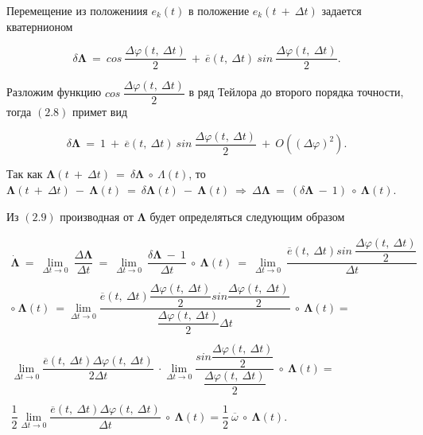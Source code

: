 \documentclass[14pt]{extreport}
\begin{document}
Перемещение из положениия $e_k(t)$ в положение $e_k(t\ +\ \Delta t)$ задается кватернионом

\begin{equation}
\delta\boldsymbol\Lambda\ =\ cos\ \dfrac{\Delta\varphi(t,\ \Delta t)}{2}\ +\ \overline{e}(t,\ \Delta t)\ sin\ \dfrac{\Delta\varphi(t,\ \Delta t)}{2}.
\end{equation}

Разложим функцию $cos\ \dfrac{\Delta\varphi(t,\ \Delta t)}{2}$ в ряд Тейлора до второго порядка точности, тогда $(2.8)$ примет вид

\begin{equation}
\delta\boldsymbol\Lambda\ =\ 1\ +\ \overline{e}(t,\ \Delta t)\ sin\ \dfrac{\Delta\varphi(t,\ \Delta t)}{2}\ +\ O((\Delta\varphi)^2).
\end{equation}

Так как $\boldsymbol\Lambda(t\ +\ \Delta t)\ =\ \delta\boldsymbol\Lambda\ \circ\ \Lambda(t)$,
то $\boldsymbol\Lambda(t\ +\ \Delta t)\ -\ \boldsymbol\Lambda(t)\ =\ \delta\boldsymbol\Lambda(t)\ -\ \boldsymbol\Lambda(t)\ \Rightarrow\ \Delta\boldsymbol\Lambda\
=\ (\delta\boldsymbol\Lambda\ -\ 1)\ \circ\ \boldsymbol\Lambda(t)$.

Из $(2.9)$ производная от $\boldsymbol\Lambda$ будет определяться следующим образом

\begin{multline*}
\boldsymbol{\dot{\Lambda}}\ =\ \lim_{\Delta t \to 0}\ \dfrac{\Delta\boldsymbol\Lambda}{\Delta t}\ =\ 
\lim_{\Delta t \to 0}\ \dfrac{\delta\boldsymbol\Lambda\ -\ 1}{\Delta t}\ \circ\ \boldsymbol\Lambda(t)\ =\
\lim_{\Delta t \to 0}\ \dfrac{\overline{e}(t,\ \Delta t)sin\ \dfrac{\Delta \varphi(t,\ \Delta t)}{2}}{\Delta t}\   \\ \\ \circ\ \boldsymbol\Lambda(t)\ = 
\lim_{\Delta t \to 0} \dfrac{\overline{e}(t,\ \Delta t)
\dfrac{\Delta \varphi(t,\ \Delta t)}{2}sin\dfrac{\Delta \varphi(t,\ \Delta t)}{2}}{\dfrac{\Delta \varphi(t,\ \Delta t)}{2} \Delta t}\ \circ\ \boldsymbol\Lambda(t) =   \\ \\
\lim_{\Delta t \to 0} \dfrac{\overline{e}(t,\ \Delta t)\Delta\varphi(t,\ \Delta t)}{2\Delta t}\ \cdot
\lim_{\Delta t \to 0}\dfrac{sin\dfrac{\Delta \varphi(t,\ \Delta t)}{2}}{\dfrac{\Delta \varphi(t,\ \Delta t)}{2}}\ \circ\ \boldsymbol\Lambda(t) =  \\ \\
\dfrac{1}{2}\lim_{\Delta t \to 0}\dfrac{\overline{e}(t,\ \Delta t)\Delta\varphi(t,\ \Delta t)}{\Delta t}\ \circ\ \boldsymbol\Lambda(t) = 
\dfrac{1}{2}\ \overline{\omega}\ \circ\ \boldsymbol\Lambda(t). 
\end{multline*}
\end{document}
